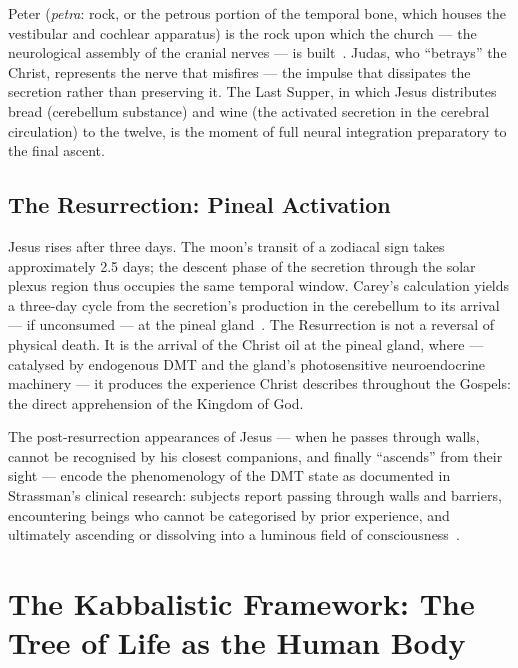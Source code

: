 \documentclass[12pt, a4paper]{article}
\begin{document}
Peter (\emph{petra}: rock, or the petrous portion of the temporal bone, which
houses the vestibular and cochlear apparatus) is the rock upon which the
church — the neurological assembly of the cranial nerves — is
built~\autocite[94]{carey1920}. Judas, who ``betrays'' the Christ, represents
the nerve that misfires — the impulse that dissipates the secretion rather
than preserving it. The Last Supper, in which Jesus distributes bread
(cerebellum substance) and wine (the activated secretion in the cerebral
circulation) to the twelve, is the moment of full neural integration
preparatory to the final ascent.

\subsection{The Resurrection: Pineal Activation}

Jesus rises after three days. The moon's transit of a zodiacal sign takes
approximately 2.5 days; the descent phase of the secretion through the solar
plexus region thus occupies the same temporal window. Carey's
calculation yields a three-day cycle from the secretion's production in the
cerebellum to its arrival — if unconsumed — at the pineal
gland~\autocite[107]{carey1932}. The Resurrection is not a reversal of
physical death. It is the arrival of the Christ oil at the pineal gland,
where — catalysed by endogenous DMT and the gland's photosensitive
neuroendocrine machinery — it produces the experience Christ describes
throughout the Gospels: the direct apprehension of the Kingdom of God.

The post-resurrection appearances of Jesus — when he passes through walls,
cannot be recognised by his closest companions, and finally ``ascends'' from
their sight — encode the phenomenology of the DMT state as documented in
Strassman's clinical research: subjects report passing through walls and
barriers, encountering beings who cannot be categorised by prior experience,
and ultimately ascending or dissolving into a luminous field of
consciousness~\autocite[186]{strassman2001}.

\section{The Kabbalistic Framework: The Tree of Life as the Human Body}
\label{sec:kabbalah}
\end{document}
